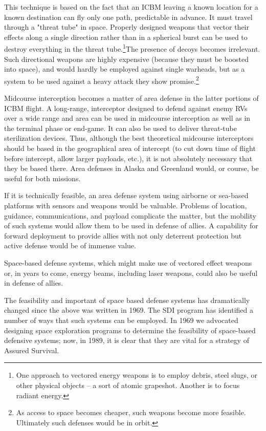This technique is based on the fact that an ICBM leaving a known location for a known destination can fly only one path, predictable in advance. It must travel through a "threat tube" in space. Properly designed weapons that vector their effects along a single direction rather than in a spherical burst can be used to destroy everything in the threat tube.\footnote{One approach to vectored energy weapons is to employ debris, steel slugs, or other physical objects -- a sort of atomic grapeshot. Another is to focus radiant energy.}The presence of decoys becomes irrelevant. Such directional weapons are highly expensive (because they must be boosted into space), and would hardly be employed against single warheads, but as a system to be used against a heavy attack they show promise.\footnote{As access to space becomes cheaper, such weapons become more feasible. Ultimately such defenses would be in orbit.}

Midcourse interception becomes a matter of area defense in the latter portions of ICBM flight. A long-range, interceptor designed to defend against enemy RVs over a wide range and area can be used in midcourse interception as well as in the terminal phase or end-game. It can also be used to deliver threat-tube sterilization devices. Thus, although the best theoretical midcourse interceptors should be based in the geographical area of intercept (to cut down time of flight before intercept, allow larger payloads, etc.), it is not absolutely necessary that they be based there. Area defenses in Alaska and Greenland would, or course, be useful for both missions.

If it is technically feasible, an area defense system using airborne or sea-based platforms with sensors and weapons would be valuable. Problems of location, guidance, communications, and payload complicate the matter, but the mobility of such systems would allow them to be used in defense of allies. A capability for forward deployment to provide allies with not only deterrent protection but active defense would be of immense value.

Space-based defense systems, which might make use of vectored effect weapons or, in years to come, energy beams, including laser weapons, could also be useful in defense of allies.

\begin{mdframed}[backgroundcolor=black!10]
The feasibility and important of space based defense systems has dramatically changed since the above was written in 1969. The SDI program has identified a number of ways that such systems can be employed. In 1969 we advocated designing space exploration programs to determine the feasibility of space-based defensive systems; now, in 1989, it is clear that they are vital for a strategy of Assured Survival.
\end{mdframed}

